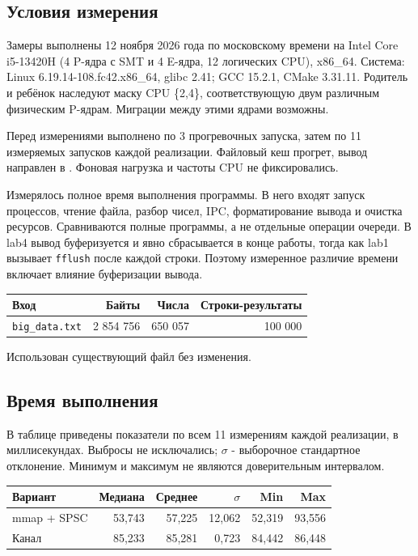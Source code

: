\documentclass[12pt,a4paper,oneside,fleqn]{article}
\begin{document}
\subsection*{Условия измерения}
Замеры выполнены 12 ноября 2026 года по московскому времени на
Intel Core i5-13420H (4 P-ядра с SMT и 4 E-ядра, 12 логических CPU), x86\_64.
Система: Linux 6.19.14-108.fc42.x86\_64, glibc 2.41;
GCC 15.2.1, CMake 3.31.11.
Родитель и ребёнок наследуют маску CPU \{2,4\}, соответствующую двум различным
физическим P-ядрам. Миграции между этими ядрами возможны.

Перед измерениями выполнено по 3 прогревочных запуска, затем по 11
измеряемых запусков каждой реализации. Файловый кеш прогрет, вывод направлен в
. Фоновая нагрузка и частоты CPU не фиксировались.

Измерялось полное время выполнения программы. В него входят запуск процессов,
чтение файла, разбор чисел, IPC, форматирование вывода и очистка ресурсов.
Сравниваются полные программы, а не отдельные операции очереди.
В lab4 вывод буферизуется и явно сбрасывается в конце работы, тогда как
lab1 вызывает \texttt{fflush} после каждой строки. Поэтому измеренное различие
времени включает влияние буферизации вывода.

\begin{center}\small
\begin{tabular}{lrrr}
\toprule Вход & Байты & Числа & Строки-результаты\\\midrule
\texttt{big\_data.txt} & 2 854 756 & 650 057 & 100 000\\
\bottomrule\end{tabular}\end{center}
Использован существующий файл  без изменения.
\subsection*{Время выполнения}
В таблице приведены показатели по всем 11 измерениям каждой реализации,
в миллисекундах. Выбросы не исключались; $\sigma$ - выборочное стандартное
отклонение. Минимум и максимум не являются доверительным интервалом.
\begin{center}\small
\begin{tabular}{lrrrrr}
\toprule Вариант & Медиана & Среднее & $\sigma$ & Min & Max\\\midrule
mmap + SPSC & 53,743 & 57,225 & 12,062 & 52,319 & 93,556\\
Канал & 85,233 & 85,281 & 0,723 & 84,442 & 86,448\\
\bottomrule\end{tabular}\end{center}
\end{document}

